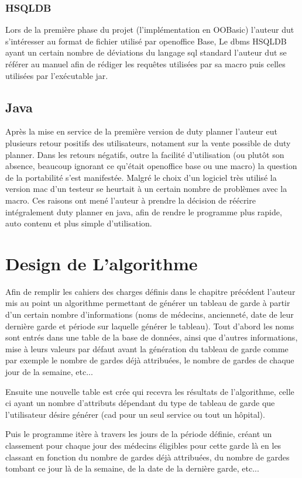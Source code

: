 \documentclass[11pt]{report}
\begin{document}
\subsubsection{HSQLDB}
Lors de la première phase du projet (l'implémentation en OOBasic) l'auteur dut s'intéresser au format de fichier utilisé par openoffice Base, Le dbms HSQLDB ayant un certain nombre de déviations du langage sql standard l'auteur dut se référer au manuel\cite{manhsqldb} afin de rédiger les requêtes utilisées par sa macro puis celles utilisées par l'exécutable jar.

\subsection{Java}
Après la mise en service de la première version de duty planner l'auteur eut plusieurs retour positifs des utilisateurs, notament sur la vente possible de duty planner. 
Dans les retours négatifs, outre la facilité d'utilisation (ou plutôt son absence, beaucoup ignorant ce qu'était openoffice base ou une macro) la question de la portabilité s'est manifestée. 
Malgré le choix d'un logiciel très utilisé la version mac d'un testeur se heurtait à un certain nombre de problèmes avec la macro.
Ces raisons ont mené l'auteur à prendre la décision de réécrire intégralement duty planner en java, afin de rendre le programme plus rapide, auto contenu et plus simple d'utilisation.
\section{Design de L'algorithme}
Afin de remplir les cahiers des charges définis dans le chapitre précédent l'auteur mis au point un algorithme permettant de générer un tableau de garde à partir d'un certain nombre d'informations (noms de médecins, ancienneté, date de leur dernière garde et période sur laquelle générer le tableau).
Tout d'abord les noms sont entrés dans une table de la base de données, ainsi que d'autres informations, mise à leurs valeurs par défaut avant la génération du  tableau de garde comme par exemple le nombre de gardes déjà attribuées, le nombre de gardes de chaque jour de la semaine, etc...


Ensuite une nouvelle table est crée qui recevra les résultats de l'algorithme, celle ci ayant un nombre d'attributs dépendant du type de tableau de garde que l'utilisateur désire générer (cad pour un seul service ou tout un hôpital).

Puis le programme itère à travers les jours de la période définie, créant un classement pour chaque jour des médecins éligibles pour cette garde là en les classant en fonction du nombre de gardes déjà attribuées, du nombre de gardes tombant ce jour là de la semaine, de la date de la dernière garde, etc...
\end{document}
